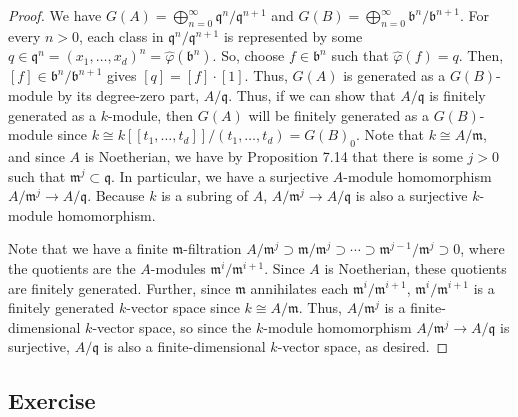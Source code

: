 \begin{proof}
We have $G(A) = \bigoplus_{n=0}^{\infty} \mathfrak{q}^n/\mathfrak{q}^{n+1}$ and $G(B) = \bigoplus_{n=0}^{\infty} \mathfrak{b}^n/\mathfrak{b}^{n+1}$. 
For every $n > 0$, each class in $\mathfrak{q}^n/\mathfrak{q}^{n+1}$ is represented by some $q \in \mathfrak{q}^n = (x_1,\ldots,x_d)^n = \hat\varphi(\mathfrak{b}^n)$. 
So, choose $f \in \mathfrak{b}^n$ such that $\hat \varphi(f) = q$. Then, $[f] \in \mathfrak{b}^{n}/\mathfrak{b}^{n+1}$ gives $[q] = [f] \cdot [1]$. Thus, $G(A)$
is generated as a $G(B)$-module by its degree-zero part, $A/\mathfrak{q}$. Thus, if we can show that $A/\mathfrak{q}$ is finitely generated as a $k$-module,
then $G(A)$ will be finitely generated as a $G(B)$-module since $k \cong k[[t_1,\ldots,t_d]]/(t_1,\ldots,t_d) = G(B)_0$. Note that $k \cong A/\mathfrak{m}$,
and since $A$ is Noetherian, we have by Proposition 7.14 that there is some $j > 0$ such that $\mathfrak{m}^j \subset \mathfrak{q}$. In particular, we have
a surjective $A$-module homomorphism $A/\mathfrak{m}^j \to A/\mathfrak{q}$. Because $k$ is a subring of $A$, $A/\mathfrak{m}^j \to A/\mathfrak{q}$ is also a surjective
$k$-module homomorphism. 

Note that we have a finite $\mathfrak{m}$-filtration $A/\mathfrak{m}^j \supset \mathfrak{m}/\mathfrak{m}^j \supset \cdots \supset \mathfrak{m}^{j-1}/\mathfrak{m}^j \supset 0$,
where the quotients are the $A$-modules $\mathfrak{m}^i/\mathfrak{m}^{i+1}$. Since $A$ is Noetherian, these quotients are finitely generated. Further, since $\mathfrak{m}$
annihilates each $\mathfrak{m}^i/\mathfrak{m}^{i+1}$, $\mathfrak{m}^i/\mathfrak{m}^{i+1}$ is a finitely generated $k$-vector space since $k \cong A/\mathfrak{m}$. Thus, 
$A/\mathfrak{m}^j$ is a finite-dimensional $k$-vector space, so since the $k$-module homomorphism $A/\mathfrak{m}^j \to A/\mathfrak{q}$ is surjective, $A/\mathfrak{q}$ is also 
a finite-dimensional $k$-vector space, as desired.
\end{proof}

\subsection{Exercise}\label{11.3}

